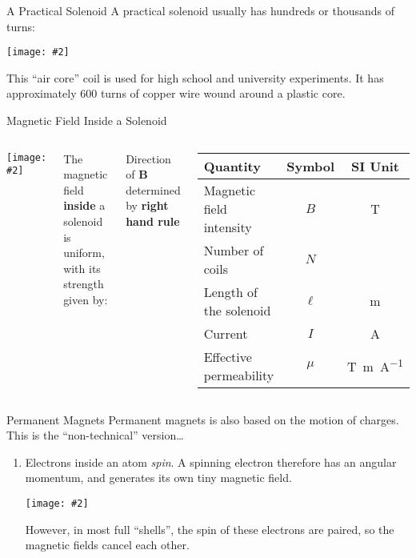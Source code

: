 \documentclass[12pt,aspectratio=169]{beamer}
\newcommand{\pic}[2]{\texttt{[image: \#2]}}
\newcommand{\eq}[2]{\vspace{#1}{\Large\begin{displaymath}#2\end{displaymath}}}
\begin{document}
\begin{frame}{A Practical Solenoid}
  A practical solenoid usually has hundreds or thousands of turns:
  \begin{center}
    \pic{.45}{1020201515330450255}
  \end{center}

  \vspace{-.2in}
  This ``air core'' coil is used for high school and university experiments. It
  has approximately 600 turns of copper wire wound around a plastic core.
\end{frame}

\begin{frame}{Magnetic Field Inside a Solenoid}
  \begin{columns}
    \pic{1}{magneticfield4}
    
    The magnetic field \textbf{inside} a solenoid is uniform, with its strength
    given by:
    
    \eq{-.2in}{
      \boxed{B=\frac{\mu NI}{\ell}}
    }
    
    Direction of $\bm{B}$ determined by \textbf{right hand rule}
    \begin{center}
      \begin{tabular}{l|c|c}
        \rowcolor{pink}
        \textbf{Quantity} & \textbf{Symbol} & \textbf{SI Unit} \\ \hline
        Magnetic field intensity & $B$    & \si{\tesla} \\
        Number of coils          & $N$    & \\
        Length of the solenoid   & $\ell$ & \si{\metre}\\
        Current                  & $I$    & \si{\ampere}\\
        Effective permeability   & $\mu$  & \si{\tesla\metre\per\ampere}
      \end{tabular}
    \end{center}
  \end{columns}
\end{frame}



\begin{frame}{Permanent Magnets}
  Permanent magnets is also based on the motion of charges. This is the
  ``non-technical'' version\ldots

  \begin{enumerate}
  \item Electrons inside an atom \emph{spin}. A spinning electron therefore has
    an angular momentum, and generates its own tiny magnetic field.
    \begin{center}
      \pic{.3}{Electron-spin}
    \end{center}
    However, in most full ``shells'', the spin of these electrons are paired,
    so the magnetic fields cancel each other.
  \end{enumerate}
\end{frame}
\end{document}
